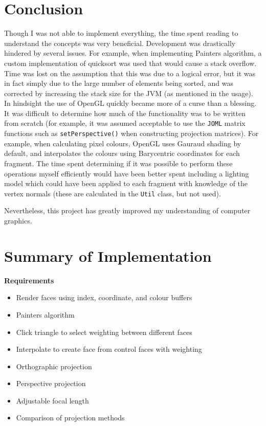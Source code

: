 \documentclass[12pt]{article}
\begin{document}
\section{Conclusion}

Though I was not able to implement everything, the time spent reading to understand the concepts was very beneficial.
Development was drastically hindered by several issues.
For example, when implementing Painters algorithm, a custom implementation of quicksort was used that would cause a stack overflow. 
Time was lost on the assumption that this was due to a logical error, but it was in fact simply due to the large number of elements being sorted, and was corrected by increasing the stack size for the JVM (as mentioned in the usage).
In hindsight the use of OpenGL quickly became more of a curse than a blessing.
It was difficult to determine how much of the functionality was to be written from scratch (for example, it was assumed acceptable to use the \texttt{JOML} matrix functions such as \texttt{setPerspective()} when constructing projection matrices).
For example, when calculating pixel colours, OpenGL uses Gauraud shading by default, and interpolates the colours using Barycentric coordinates for each fragment.
The time spent determining if it was possible to perform these operations myself efficiently would have been better spent including a lighting model which could have been applied to each fragment with knowledge of the vertex normals (these are calculated in the \texttt{Util} class, but not used).

Nevertheless, this project has greatly improved my understanding of computer graphics.

\newpage
\section{Summary of Implementation}
\noindent\textbf{Requirements}
\begin{itemize}
    \itemsep0em
    \item  Render faces using index, coordinate, and colour buffers
    \item  Painters algorithm 
    \item  Click triangle to select weighting between different faces
    \item  Interpolate to create face from control faces with weighting
    \item  Orthographic projection
    \item  Perspective projection
    \item  Adjustable focal length
    \item  Comparison of projection methods
\end{itemize}
\end{document}
